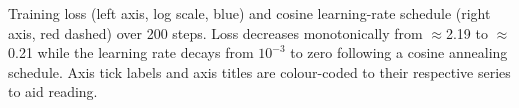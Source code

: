 \caption{Training loss (left axis, log scale, blue) and cosine learning-rate schedule (right axis, red dashed) over 200 steps. Loss decreases monotonically from $\approx$2.19 to $\approx$0.21 while the learning rate decays from $10^{-3}$ to zero following a cosine annealing schedule. Axis tick labels and axis titles are colour-coded to their respective series to aid reading.}

